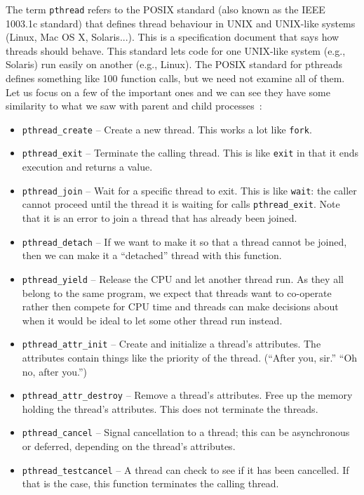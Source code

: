 The term \texttt{pthread} refers to the POSIX standard (also known as the IEEE 1003.1c standard) that defines thread behaviour in UNIX and UNIX-like systems (Linux, Mac OS X, Solaris...). This is a specification document that says how threads should behave. This standard lets code for one UNIX-like system (e.g., Solaris) run easily on another (e.g., Linux). The POSIX standard for pthreads defines something like 100 function calls, but we need not examine all of them. Let us focus on a few of the important ones and we can see they have some similarity to what we saw with parent and child processes~\cite{mos}:

\begin{itemize}
	\item \texttt{pthread\_create} -- Create a new thread. This works a lot like \texttt{fork}.
	\item \texttt{pthread\_exit} -- Terminate the calling thread. This is like \texttt{exit} in that it ends execution and returns a value.
	\item \texttt{pthread\_join} -- Wait for a specific thread to exit. This is like \texttt{wait}: the caller cannot proceed until the thread it is waiting for calls \texttt{pthread\_exit}. Note that it is an error to join a thread that has already been joined.
	\item \texttt{pthread\_detach} -- If we want to make it so that a thread cannot be joined, then we can make it a ``detached'' thread with this function.
	\item \texttt{pthread\_yield} -- Release the CPU and let another thread run. As they all belong to the same program, we expect that threads want to co-operate rather then compete for CPU time and threads can make decisions about when it would be ideal to let some other thread run instead.
	\item \texttt{pthread\_attr\_init} -- Create and initialize a thread's attributes. The attributes contain things like the priority of the thread. (``After you, sir.'' ``Oh no, after you.'')
	\item \texttt{pthread\_attr\_destroy} -- Remove a thread's attributes. Free up the memory holding the thread's attributes. This does not terminate the threads.
	\item \texttt{pthread\_cancel} -- Signal cancellation to a thread; this can be asynchronous or deferred, depending on the thread's attributes.
	\item \texttt{pthread\_testcancel} -- A thread can check to see if it has been cancelled. If that is the case, this function terminates the calling thread.
\end{itemize}

